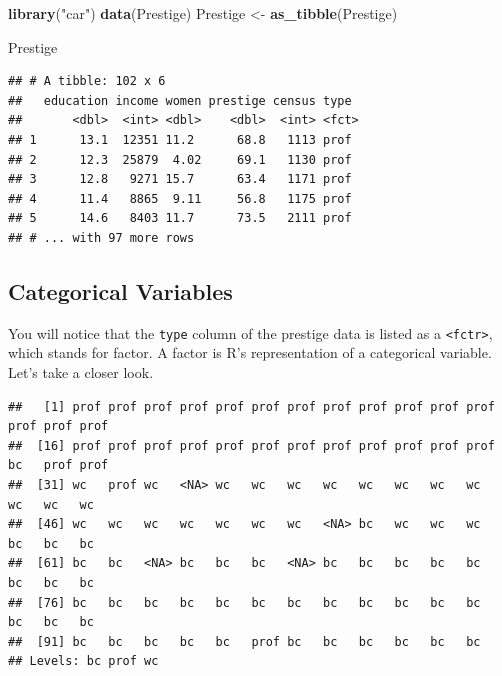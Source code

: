 \documentclass[12pt,oneside,openany]{book}
\newenvironment{Shaded}{\begin{snugshade}}{\end{snugshade}}
\newcommand{\KeywordTok}[1]{\textcolor[rgb]{0.13,0.29,0.53}{\textbf{#1}}}
\newcommand{\StringTok}[1]{\textcolor[rgb]{0.31,0.60,0.02}{#1}}
\newcommand{\OperatorTok}[1]{\textcolor[rgb]{0.81,0.36,0.00}{\textbf{#1}}}
\newcommand{\NormalTok}[1]{#1}
\begin{document}
\begin{Shaded}
\begin{Highlighting}[]
\KeywordTok{library}\NormalTok{(}\StringTok{"car"}\NormalTok{)}
\KeywordTok{data}\NormalTok{(Prestige)}
\NormalTok{Prestige <-}\StringTok{ }\KeywordTok{as_tibble}\NormalTok{(Prestige)}

\NormalTok{Prestige}
\end{Highlighting}
\end{Shaded}

\begin{verbatim}
## # A tibble: 102 x 6
##   education income women prestige census type 
##       <dbl>  <int> <dbl>    <dbl>  <int> <fct>
## 1      13.1  12351 11.2      68.8   1113 prof 
## 2      12.3  25879  4.02     69.1   1130 prof 
## 3      12.8   9271 15.7      63.4   1171 prof 
## 4      11.4   8865  9.11     56.8   1175 prof 
## 5      14.6   8403 11.7      73.5   2111 prof 
## # ... with 97 more rows
\end{verbatim}

\subsection{Categorical Variables}\label{categorical-variables-1}

You will notice that the \texttt{type} column of the prestige data is
listed as a \texttt{\textless{}fctr\textgreater{}}, which stands for
factor. A factor is R's representation of a categorical variable. Let's
take a closer look.

\begin{Shaded}
\end{Shaded}

\begin{verbatim}
##   [1] prof prof prof prof prof prof prof prof prof prof prof prof prof prof prof
##  [16] prof prof prof prof prof prof prof prof prof prof prof prof bc   prof prof
##  [31] wc   prof wc   <NA> wc   wc   wc   wc   wc   wc   wc   wc   wc   wc   wc  
##  [46] wc   wc   wc   wc   wc   wc   wc   <NA> bc   wc   wc   wc   bc   bc   bc  
##  [61] bc   bc   <NA> bc   bc   bc   <NA> bc   bc   bc   bc   bc   bc   bc   bc  
##  [76] bc   bc   bc   bc   bc   bc   bc   bc   bc   bc   bc   bc   bc   bc   bc  
##  [91] bc   bc   bc   bc   bc   prof bc   bc   bc   bc   bc   bc  
## Levels: bc prof wc
\end{verbatim}
\end{document}
